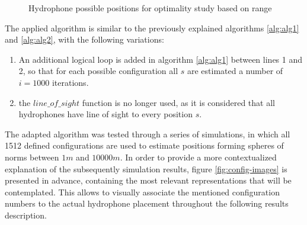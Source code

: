 \begin{figure}[!htb]
	\captionsetup{justification=centering,margin=2cm}
	\caption{Hydrophone possible positions for optimality study based on range}
	\label{fig:24h-config}
\end{figure}

The applied algorithm is similar to the previously explained algorithms \ref{alg:alg1} and \ref{alg:alg2}, with the following variations:

\begin{enumerate}
		
	\item An additional logical loop is added in algorithm \ref{alg:alg1} between lines 1 and 2, so that for each possible configuration all $s$ are estimated a number of $i = 1000$ iterations.
	
	\item the $line\_of\_sight$ function is no longer used, as it is considered that all hydrophones have line of sight to every position $s$.
	
\end{enumerate}

The adapted algorithm was tested through a series of simulations, in which all 1512 defined configurations are used to estimate positions forming spheres of norms between $1m$ and $10000m$. In order to provide a more contextualized explanation of the subsequently simulation results, figure \ref{fig:config-images} is presented in advance, containing the most relevant representations that will be contemplated. This allows to visually associate the mentioned configuration numbers to the actual hydrophone placement throughout the following results description.

